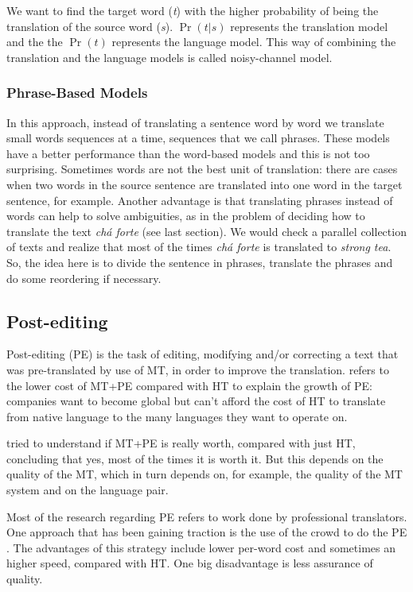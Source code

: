 We want to find the target word (\textit{t}) with the higher probability of being the translation of the source word (\textit{s}). $\Pr(t|s)$ represents the translation model and the the $\Pr(t)$ represents the language model. This way of combining the translation and the language models is called noisy-channel model.

\subsubsection{Phrase-Based Models}

In this approach, instead of translating a sentence word by word we translate small words sequences at a time, sequences that we call phrases. These models have a better performance than the word-based models and this is not too surprising. Sometimes words are not the best unit of translation: there are cases when two words in the source sentence are translated into one word in the target sentence, for example. Another advantage is that translating phrases instead of words can help to solve ambiguities, as in the problem of deciding how to translate the text \textit{chá forte} (see last section). We would check a parallel collection of texts and realize that most of the times \textit{chá forte} is translated to \textit{strong tea}. So, the idea here is to divide the sentence in phrases, translate the phrases and do some reordering if necessary.

\subsection{Post-editing}

Post-editing (PE) is the task of editing, modifying and/or correcting a text that was pre-translated by use of MT, in order to improve the translation. \citep{Somers2003} refers to the lower cost of MT+PE compared with HT to explain the growth of PE: companies want to become global but can't afford the cost of HT to translate from native language to the many languages they want to operate on.

\citep{Koponen2016a} tried to understand if MT+PE is really worth, compared with just HT, concluding that yes, most of the times it is worth it. But this depends on the quality of the MT, which in turn depends on, for example, the quality of the MT system and on the language pair.

Most of the research regarding PE refers to work done by professional translators. One approach that has been gaining traction is the use of the crowd to do the PE \citep{Tatsumi2012a}. The advantages of this strategy include lower per-word cost and sometimes an higher speed, compared with HT. One big disadvantage is less assurance of quality.

